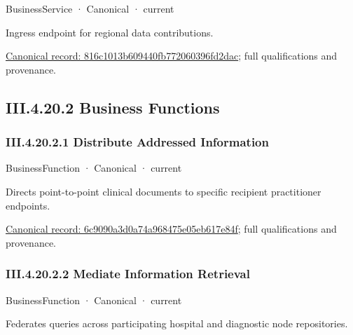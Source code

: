 \label{element:816c1013b609440fb772060396fd2dac}
{\small BusinessService · Canonical · current}\par

Ingress endpoint for regional data contributions.


{\footnotesize \href{../../../../continuum/business/business-service/816c1013b609440fb772060396fd2dac.md}{Canonical record: 816c1013b609440fb772060396fd2dac}; full qualifications and provenance.}\par
\subsection*{III.4.20.2 Business Functions}
\label{navigation:III.4.20.2}

\subsubsection*{III.4.20.2.1 Distribute Addressed Information}
\label{navigation:III.4.20.2.1}

\label{element:6c9090a3d0a74a968475e05eb617e84f}
{\small BusinessFunction · Canonical · current}\par

Directs point-to-point clinical documents to specific recipient practitioner endpoints.


{\footnotesize \href{../../../../continuum/business/business-function/6c9090a3d0a74a968475e05eb617e84f.md}{Canonical record: 6c9090a3d0a74a968475e05eb617e84f}; full qualifications and provenance.}\par
\subsubsection*{III.4.20.2.2 Mediate Information Retrieval}
\label{navigation:III.4.20.2.2}

\label{element:7667abb329724b7d894fca020acb8014}
{\small BusinessFunction · Canonical · current}\par

Federates queries across participating hospital and diagnostic node repositories.


